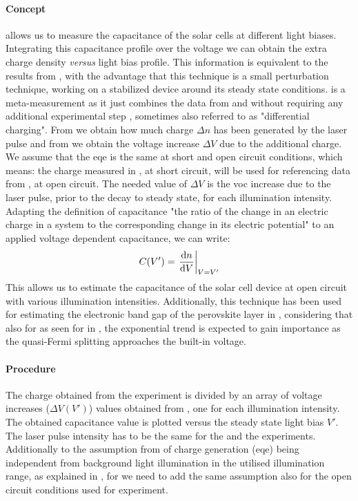 	\paragraph{Concept}
	 allows us to measure the capacitance of the solar cells at different light biases.
	Integrating this capacitance profile over the voltage we can obtain the extra charge density \textit{versus} light bias profile.
	This information is equivalent to the results from , with the advantage that this technique is a small perturbation technique, working on a stabilized device around its steady state conditions.
	 is a meta-measurement as it just combines the data from  and  without requiring any additional experimental step \cite{ORegan2005,ORegan2006,Shuttle2008,Credgington2014}, sometimes also referred to as "differential charging".
	From  we obtain how much charge $\Delta n$ has been generated by the laser pulse and from  we obtain the voltage increase $\Delta V$ due to the additional charge.
	We assume that the \gls{eqe} is the same at short and open circuit conditions, which means: the charge measured in , at short circuit, will be used for referencing data from , at open circuit.
The needed value of $\Delta V$ is the \gls{voc} increase due to the laser pulse, prior to the decay to steady state, for each illumination intensity.
	Adapting the definition of capacitance "the ratio of the change in an electric charge in a system to the corresponding change in its electric potential" \cite{WikipediaCapacitance2019} to an applied voltage dependent capacitance, we can write:
	$$C(V') = \eval{\dv{n}{V}}_{V=V'}$$
	This allows us to estimate the capacitance of the solar cell device at open circuit with various illumination intensities.
	Additionally, this technique has been used for estimating the electronic band gap of the perovskite layer in , considering that also for  as seen for  in , the exponential trend is expected to gain importance as the quasi-Fermi splitting approaches the built-in voltage.
	
	\paragraph{Procedure}
		The charge obtained from the  experiment is divided by an array of voltage increases ($\Delta V(V')$) values obtained from , one for each illumination intensity.
		The obtained capacitance value is plotted versus the steady state light bias $V'$.
		The laser pulse intensity has to be the same for the  and the  experiments.
		Additionally to the assumption from  of charge generation (\gls{eqe}) being independent from background light illumination in the utilised illumination range, as explained in , for  we need to add the same assumption also for the open circuit conditions used for  experiment.
	
